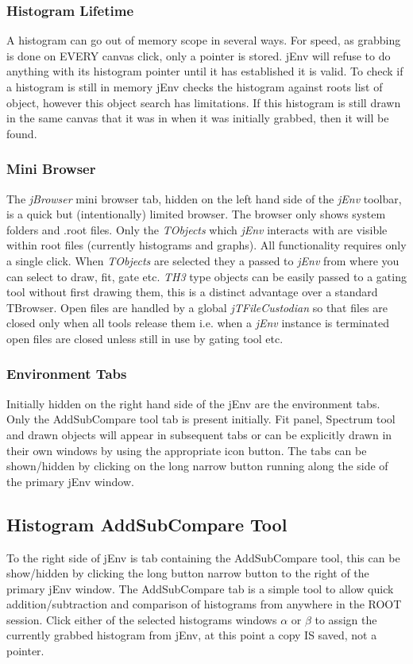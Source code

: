 \documentclass[a4paper,10pt]{article}
\begin{document}
\subsubsection{Histogram Lifetime}
A histogram can go out of memory scope in several ways. For speed, as grabbing is done on EVERY canvas click, only a pointer is stored. jEnv will refuse to do anything with its histogram pointer until it has established it is valid. To check if a histogram is still in memory jEnv checks the histogram against roots list of object, however this object search has limitations. If this histogram is still drawn in the same canvas that it was in when it was initially grabbed, then it will be found.

\subsubsection{Mini Browser}

The \textit{jBrowser} mini browser tab, hidden on the left hand side of the \textit{jEnv} toolbar, is a quick but (intentionally) limited browser.
The browser only shows system folders and .root files.
Only the \textit{TObjects} which \textit{jEnv} interacts with are visible within root files (currently histograms and graphs).
All functionality requires only a single click.
When \textit{TObjects} are selected they a passed to \textit{jEnv} from where you can select to draw, fit, gate etc.
 \textit{TH3} type objects can be easily passed to a gating tool without first drawing them, this is a distinct advantage over a standard TBrowser.
 Open files are handled by a global \textit{jTFileCustodian} so that files are closed only when all tools release them i.e. when a \textit{jEnv} instance is terminated open files are closed unless still in use by gating tool etc. 

\subsubsection{Environment Tabs}
Initially hidden on the right hand side of the jEnv are the environment tabs. Only the AddSubCompare tool tab is present initially. Fit panel, Spectrum tool and drawn objects will appear in subsequent tabs or can be explicitly drawn in their own windows by using the appropriate icon button.
The tabs can be shown/hidden by clicking on the long narrow button running along the side of the primary jEnv window.

\newpage
\subsection{Histogram AddSubCompare Tool}
To the right side of jEnv is tab containing the AddSubCompare tool, this can be show/hidden by clicking the long button narrow button to the right of the primary jEnv window. The AddSubCompare tab is a simple tool to allow quick addition/subtraction and comparison of histograms from anywhere in the ROOT session.
Click either of the selected histograms windows $\alpha$ or $\beta$ to assign the currently grabbed histogram from jEnv, at this point a copy IS saved, not a pointer.
\end{document}
